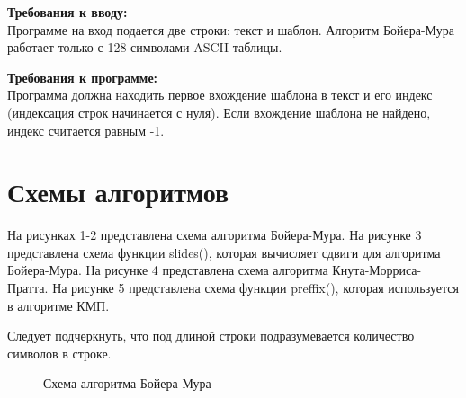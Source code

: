 \documentclass[a4paper,14pt]{report}
\begin{document}
\textbf{Требования к вводу:}\\

Программе на вход подается две строки: текст и шаблон. Алгоритм Бойера-Мура работает только с 128 символами ASCII-таблицы.


\textbf{Требования к программе:}\\
Программа должна находить первое вхождение шаблона в текст и его индекс (индексация строк начинается с нуля). Если вхождение шаблона не найдено, индекс считается равным -1.

\section*{Схемы алгоритмов}

На рисунках 1-2 представлена схема алгоритма Бойера-Мура. На рисунке 3 представлена схема функции slides(), которая вычисляет сдвиги для алгоритма Бойера-Мура.
На рисунке 4 представлена схема алгоритма Кнута-Морриса-Пратта. На рисунке 5 представлена схема функции preffix(), которая используется в алгоритме КМП.

Следует подчеркнуть, что под длиной строки подразумевается количество символов в строке.

\begin{figure}[h]
\caption{Схема алгоритма Бойера-Мура}
\label{fig:image}
\end{figure}
\end{document}

